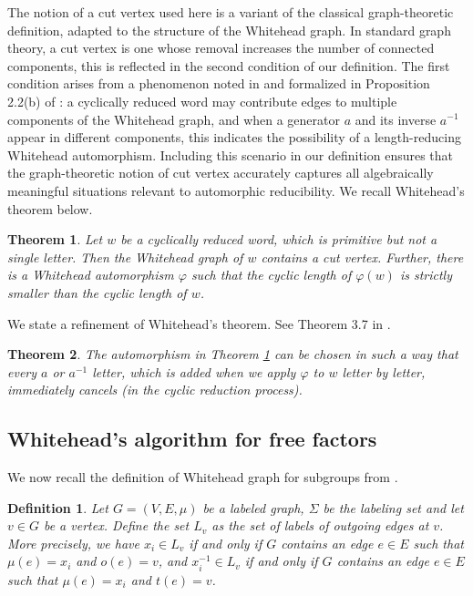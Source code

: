 \documentclass{article}
\newtheorem{mythm}{Theorem}[section]
\newtheorem{mydef}{Definition}[section]
\begin{document}
The notion of a cut vertex used here is a variant of the classical graph-theoretic definition, adapted to the structure of the Whitehead graph. In standard graph theory, a cut vertex is one whose removal increases the number of connected components, this is reflected in the second condition of our definition. The first condition arises from a phenomenon noted in \cite{stong1997diskbusting} and formalized in Proposition 2.2(b) of \cite{stallings1999whitehead}: a cyclically reduced word may contribute edges to multiple components of the Whitehead graph, and when a generator $a$ and its inverse $a^{-1}$ appear in different components, this indicates the possibility of a length-reducing Whitehead automorphism. Including this scenario in our definition ensures that the graph-theoretic notion of cut vertex accurately captures all algebraically meaningful situations relevant to automorphic reducibility. We recall Whitehead's theorem below. 

\begin{mythm}\label{cutvertex}
Let $w$ be a cyclically reduced word, which is primitive but not a single letter. Then the Whitehead graph of $w$ contains a cut vertex. Further, there is a Whitehead automorphism $\varphi$ such that the cyclic length of $\varphi(w)$ is strictly smaller than the cyclic length of $w$.
\end{mythm}

We state a refinement of Whitehead's theorem. See Theorem 3.7 in \cite{ascari2021fine}. 
 
\begin{mythm}\label{finesse}
The automorphism in \textnormal{Theorem \ref{cutvertex}} can be chosen in such a way that every $a$ or $a^{-1}$ letter, which is added when we apply $\varphi$ to $w$ letter by letter, immediately cancels (in the cyclic reduction process).
\end{mythm}

\subsection{Whitehead’s algorithm for free factors}

We now recall the definition of Whitehead graph for subgroups from \cite{ascari2021fine}.

\begin{mydef}\label{Letters}
Let $G = (V,E,\mu)$ be a labeled graph, $\Sigma$ be the labeling set and let $v\in G$ be a vertex. Define the set $L_v$ as the set of labels of outgoing edges at $v$. More precisely, we have $x_i\in L_v$ if and only if $G$ contains an edge $e \in E$ such that $\mu(e) = x_i$ and $o(e) =v$, and $x_i^{-1}\in L_v$ if and only if $G$ contains an edge $e \in E$ such that $\mu(e) = x_i$ and $t(e) =v$.
\end{mydef}
\end{document}
